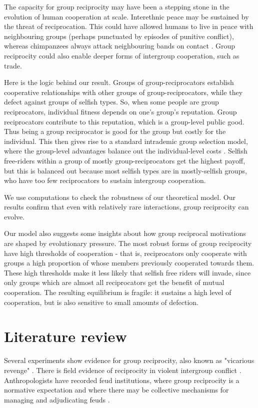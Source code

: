 \documentclass[12pt,a4paper]{article}
\begin{document}
The capacity for group reciprocity may have been a stepping stone in the evolution of human cooperation at scale. Interethnic peace may be sustained by the threat of reciprocation. This could have allowed humans to live in peace with neighbouring groups (perhaps punctuated by episodes of punitive conflict), whereas chimpanzees always attack neighbouring bands on contact \parencite{wrangham2012intergroup}. Group reciprocity could also enable deeper forms of intergroup cooperation, such as trade.

Here is the logic behind our result. Groups of group-reciprocators establish cooperative relationships with other groups of group-reciprocators, while they defect against groups of selfish types. So, when some people are group reciprocators, individual fitness depends on one's group's reputation. Group reciprocators contribute to this reputation, which is a group-level public good. Thus being a group reciprocator is good for the group but costly for the individual. This then gives rise to a standard intrademic group selection model, where the group-level advantages balance out the individual-level costs 
\parencite{wilson1983group,wade1978critical}. Selfish free-riders within a group of mostly group-reciprocators get the highest payoff, but this is balanced out because most selfish types are in mostly-selfish groups, who have too few reciprocators to sustain intergroup cooperation.

We use computations to check the robustness of our theoretical model. Our results confirm that even with relatively rare interactions, group reciprocity can evolve.

Our model also suggests some insights about how group reciprocal motivations are shaped by evolutionary pressure. The most robust forms of group reciprocity have high thresholds of cooperation - that is, reciprocators only cooperate with groups a high proportion of whose members previously cooperated towards them. These high thresholds make it less likely that selfish free riders will invade, since only groups which are almost all reciprocators get the benefit of mutual cooperation. The resulting equilibrium is fragile: it sustains a high level of cooperation, but is also sensitive to small amounts of defection.

\section{Literature review}

Several experiments show evidence for group reciprocity, also known as "vicarious
revenge" \parencite{lickel_vicarious_2006,gaertner2008whenrejection,stenstrom_roles_2008,hugh2017intergroup,hugh2019humans,romano2022direct}. There is field 
evidence of reciprocity in violent intergroup conflict \parencite{haushofer_both_2010}.
Anthropologists have recorded feud institutions, where group reciprocity is a
normative expectation and where there may be collective mechanisms for managing 
and adjudicating feuds \parencite{boehm1984blood,chagnon1988lifehistories}. 
\end{document}
